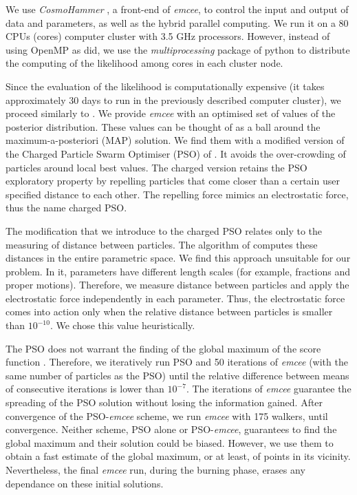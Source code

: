 We use \emph{CosmoHammer} \citep{Akeret2013}, a front-end of \emph{emcee}, to control the input and output of data and parameters, as well as the hybrid parallel computing. We run it on a 80 CPUs (cores) computer cluster with 3.5 GHz processors. However, instead of using OpenMP as \citep{Akeret2013} did, we use the \emph{multiprocessing} package of python to distribute the computing of the likelihood among cores in each cluster node. 

Since the evaluation of the likelihood is computationally expensive (it takes approximately 30 days to run in the previously described computer cluster), we proceed similarly to \citet{Akeret2013}. We provide \emph{emcee} with an optimised set of values of the posterior distribution. These values can be thought of as a ball around the maximum-a-posteriori (MAP) solution. We find them with a modified version of the Charged Particle Swarm Optimiser (PSO) of \citet{Blackwell2002}. It avoids the over-crowding of particles around local best values. The charged version retains the PSO exploratory property by repelling particles that come closer than a certain user specified distance to each other. The repelling force mimics an electrostatic force, thus the name charged PSO. 

The modification that we introduce to the charged PSO relates only to the measuring of distance between particles. The algorithm of \citet{Blackwell2002} computes these distances in the entire parametric space. We find this approach unsuitable for our problem. In it, parameters have different length scales (for example, fractions and proper motions). Therefore, we measure distance between particles and apply the electrostatic force independently in each parameter. Thus, the electrostatic force comes into action only when the relative distance between particles is smaller than $10^{-10}$. We chose this value heuristically.

The PSO does not warrant the finding of the global maximum of the score function \cite[see][and references therein]{Blackwell2002, Clerc2002}. Therefore, we iteratively run PSO and 50 iterations of \emph{emcee} (with the same number of particles as the PSO) until the relative difference between means of consecutive iterations is lower than $10^{-7}$. The iterations of \emph{emcee} guarantee the spreading of the PSO solution without losing the information gained. After convergence of the PSO-\emph{emcee} scheme, we run \emph{emcee} with 175 walkers, until convergence. Neither scheme, PSO alone or PSO-\emph{emcee}, guarantees to find the global maximum and their solution could be biased. However, we use them to obtain a fast estimate of the global maximum, or at least, of points in its vicinity. Nevertheless, the final \emph{emcee} run, during the burning phase, erases any dependance on these initial solutions.

